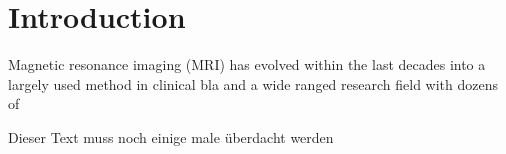 %
%
%

\section{Introduction}

Magnetic resonance imaging (MRI) has evolved within the last decades into a largely used method in clinical bla and a wide ranged research field with dozens of

Dieser Text muss noch einige male überdacht werden